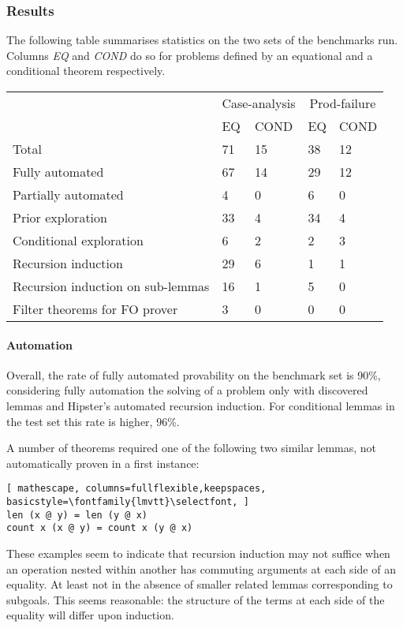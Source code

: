 \subsubsection{Results}

The following table summarises statistics on the two sets of the benchmarks run.
%
Columns \emph{EQ} and \emph{COND} do so for problems defined by an equational and a conditional theorem respectively.

\begin{tabularx}{\textwidth}{l | X X | X X}
  & \multicolumn{2}{c|}{Case-analysis} & \multicolumn{2}{c}{Prod-failure} \\
  &  EQ & COND & EQ & COND \\
  \hline
  Total & 71 & 15 & 38 & 12 \\
  \hline
  Fully automated & 67 & 14 & 29 & 12 \\
  Partially automated & 4 & 0 & 6 & 0 \\
  \hline
  Prior exploration & 33 & 4 & 34 & 4 \\
  Conditional exploration & 6 & 2 & 2 & 3 \\
  \hline
  Recursion induction & 29 & 6 & 1 & 1 \\
  Recursion induction on sub-lemmas & 16 & 1 & 5 & 0 \\
  \hline
  Filter theorems for FO prover & 3 & 0 & 0 & 0 \\ %
\end{tabularx}

\paragraph{Automation}
%
Overall, the rate of fully automated provability on the benchmark set is 90\%, considering fully automation the solving of a problem only with discovered lemmas and Hipster's automated recursion induction.
%
For conditional lemmas in the test set this rate is higher, 96\%.

A number of theorems required one of the following two similar lemmas, not automatically proven in a first instance:

\begin{lstlisting}[ mathescape, columns=fullflexible,keepspaces, basicstyle=\fontfamily{lmvtt}\selectfont, ]
len (x @ y) = len (y @ x)
count x (x @ y) = count x (y @ x)
\end{lstlisting}

\noindent These examples seem to indicate that recursion induction may not suffice when an operation nested within another has commuting arguments at each side of an equality.
%
At least not in the absence of smaller related lemmas corresponding to subgoals.
%
This seems reasonable: the structure of the terms at each side of the equality will differ upon induction.

